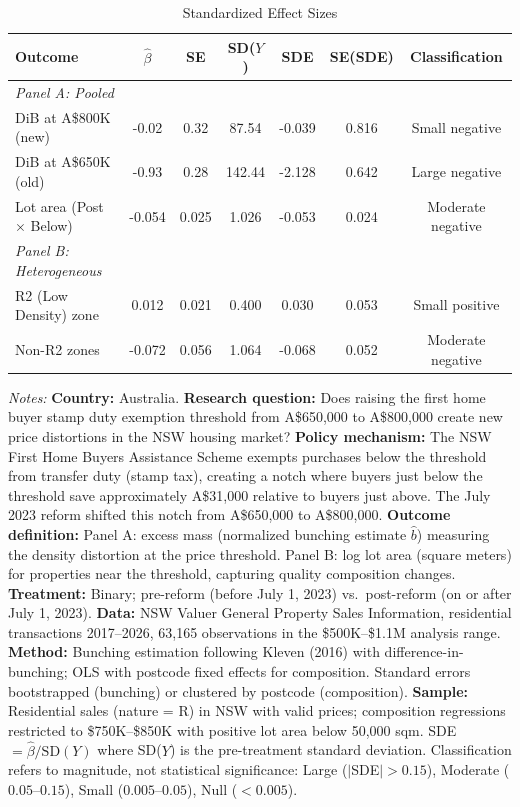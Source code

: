 \begin{table}[t]
\centering
\caption{Standardized Effect Sizes}
\label{tab:sde}
\begin{tabular}{lcccccc}
\hline\hline
Outcome & $\hat{\beta}$ & SE & SD($Y$) & SDE & SE(SDE) & Classification \\
\hline
\textit{Panel A: Pooled} & & & & & & \\
DiB at A\$800K (new) & -0.02 & 0.32 & 87.54 & -0.039 & 0.816 & Small negative \\
DiB at A\$650K (old) & -0.93 & 0.28 & 142.44 & -2.128 & 0.642 & Large negative \\
Lot area (Post $\times$ Below) & -0.054 & 0.025 & 1.026 & -0.053 & 0.024 & Moderate negative \\
[6pt]
\textit{Panel B: Heterogeneous} & & & & & & \\
R2 (Low Density) zone & 0.012 & 0.021 & 0.400 & 0.030 & 0.053 & Small positive \\
Non-R2 zones & -0.072 & 0.056 & 1.064 & -0.068 & 0.052 & Moderate negative \\
\hline\hline
\end{tabular}
\begin{tablenotes}[flushleft]\small
\item \textit{Notes:} \textbf{Country:} Australia. \textbf{Research question:} Does raising the first home buyer stamp duty exemption threshold from A\$650,000 to A\$800,000 create new price distortions in the NSW housing market? \textbf{Policy mechanism:} The NSW First Home Buyers Assistance Scheme exempts purchases below the threshold from transfer duty (stamp tax), creating a notch where buyers just below the threshold save approximately A\$31,000 relative to buyers just above. The July 2023 reform shifted this notch from A\$650,000 to A\$800,000. \textbf{Outcome definition:} Panel A: excess mass (normalized bunching estimate $\hat{b}$) measuring the density distortion at the price threshold. Panel B: log lot area (square meters) for properties near the threshold, capturing quality composition changes. \textbf{Treatment:} Binary; pre-reform (before July 1, 2023) vs.\ post-reform (on or after July 1, 2023). \textbf{Data:} NSW Valuer General Property Sales Information, residential transactions 2017--2026, 63,165 observations in the \$500K--\$1.1M analysis range. \textbf{Method:} Bunching estimation following Kleven (2016) with difference-in-bunching; OLS with postcode fixed effects for composition. Standard errors bootstrapped (bunching) or clustered by postcode (composition). \textbf{Sample:} Residential sales (nature = R) in NSW with valid prices; composition regressions restricted to \$750K--\$850K with positive lot area below 50,000 sqm. SDE $= \hat{\beta} / \text{SD}(Y)$ where SD($Y$) is the pre-treatment standard deviation. Classification refers to magnitude, not statistical significance: Large ($|$SDE$| > 0.15$), Moderate ($0.05$--$0.15$), Small ($0.005$--$0.05$), Null ($< 0.005$).
\end{tablenotes}
\end{table}

